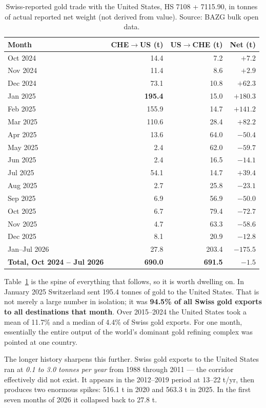 \documentclass[11pt,a4paper]{article}
\begin{document}
\begin{table}[h]
\centering
\begin{tabular}{@{}lrrr@{}}
\toprule
\textbf{Month} & \textbf{CHE$\to$US (t)} & \textbf{US$\to$CHE (t)} & \textbf{Net (t)} \\
\midrule
Oct 2024 & 14.4 & 7.2 & $+7.2$ \\
Nov 2024 & 11.4 & 8.6 & $+2.9$ \\
Dec 2024 & 73.1 & 10.8 & $+62.3$ \\
Jan 2025 & \textbf{195.4} & 15.0 & $+180.3$ \\
Feb 2025 & 155.9 & 14.7 & $+141.2$ \\
Mar 2025 & 110.6 & 28.4 & $+82.2$ \\
Apr 2025 & 13.6 & 64.0 & $-50.4$ \\
May 2025 & 2.4 & 62.0 & $-59.7$ \\
Jun 2025 & 2.4 & 16.5 & $-14.1$ \\
Jul 2025 & 54.1 & 14.7 & $+39.4$ \\
Aug 2025 & 2.7 & 25.8 & $-23.1$ \\
Sep 2025 & 6.9 & 56.9 & $-50.0$ \\
Oct 2025 & 6.7 & 79.4 & $-72.7$ \\
Nov 2025 & 4.7 & 63.3 & $-58.6$ \\
Dec 2025 & 8.1 & 20.9 & $-12.8$ \\
Jan--Jul 2026 & 27.8 & 203.4 & $-175.5$ \\
\midrule
\textbf{Total, Oct 2024 -- Jul 2026} & \textbf{690.0} & \textbf{691.5} & \textbf{$-1.5$} \\
\bottomrule
\end{tabular}
\caption{Swiss-reported gold trade with the United States, HS 7108 + 7115.90, in tonnes of
actual reported net weight (not derived from value). Source: BAZG bulk open data.}
\label{tab:flow}
\end{table}

Table~\ref{tab:flow} is the spine of everything that follows, so it is worth dwelling on. In
January 2025 Switzerland sent 195.4 tonnes of gold to the United States. That is not merely a
large number in isolation; it was \textbf{94.5\% of all Swiss gold exports to all destinations
that month}. Over 2015--2024 the United States took a mean of 11.7\% and a median of 4.4\% of
Swiss gold exports. For one month, essentially the entire output of the world's dominant gold
refining complex was pointed at one country.

The longer history sharpens this further. Swiss gold exports to the United States ran at
\emph{0.1 to 3.0 tonnes per year} from 1988 through 2011 --- the corridor effectively did not
exist. It appears in the 2012--2019 period at 13--22 t/yr, then produces two enormous spikes:
516.1 t in 2020 and 563.3 t in 2025. In the first seven months of 2026 it collapsed back to
27.8 t.
\end{document}
